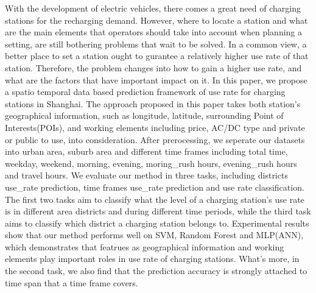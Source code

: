 With the development of electric vehicles, there comes a great need of charging stations for the recharging demand. However, where to locate a station and what are the main elements that operators should take into account when planning a setting, are still bothering problems that wait to be solved. In a common view, a better place to set a station ought to gurantee a relatively higher use rate of that station. Therefore, the problem changes into how to gain a higher use rate, and what are the factors that have important impact on it. In this paper, we propose a spatio temporal data based prediction framework of use rate for charging stations in Shanghai. The approach proposed in this paper takes both station's geographical information, such as longitude, latitude, surrounding Point of Interests(POIs), and working elements including price, AC/DC type and private or public to use, into consideration. After prerocessing, we seperate our datasets into urban area, suburb area and different time frames including total time, weekday, weekend, morning, evening, moring\_rush hours, evening\_rush hours and travel hours. We evaluate our method in three tasks, including districts use\_rate prediction, time frames use\_rate  prediction and use rate classification. The first two tasks aim to classify what the level of a charging station's use rate is in different area districts and during different time periods, while the third task aims to classify which district a charging station belongs to. Experimental results show that our method performs well on SVM, Random Forest and MLP(ANN), which demonstrates that featrues as geographical information and working elements play important roles in use rate of charging stations. What's more, in the second task, we also find that the prediction accuracy is strongly attached to time span that a time frame covers.
